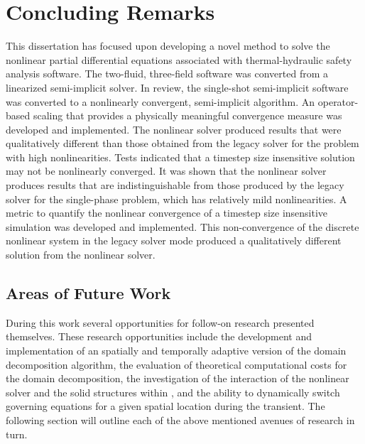 \chapter{Concluding Remarks}
\label{chap:end}
This dissertation has focused upon developing a novel method to solve the nonlinear partial differential equations associated with thermal-hydraulic safety analysis software.
The two-fluid, three-field software \cobra{} was converted from a linearized semi-implicit solver.
In review, the single-shot semi-implicit \cobra{} software was converted to a nonlinearly convergent, semi-implicit algorithm.
An operator-based scaling that provides a physically meaningful convergence measure was developed and implemented.
The nonlinear solver produced results that were qualitatively different than those obtained from the legacy solver for the problem with high nonlinearities.
Tests indicated that a timestep size insensitive solution may not be nonlinearly converged.
It was shown that the nonlinear solver produces results that are indistinguishable from those produced by the legacy solver for the single-phase problem, which has relatively mild nonlinearities.
A metric to quantify the nonlinear convergence of a timestep size insensitive simulation was developed and implemented.
This non-convergence of the discrete nonlinear system in the legacy solver mode produced a qualitatively different solution from the nonlinear solver.

\section{Areas of Future Work}
\label{sect:futureWork}
During this work several opportunities for follow-on research presented themselves.
These research opportunities include the development and implementation of an spatially and temporally adaptive version of the domain decomposition algorithm, the evaluation of theoretical computational costs for the domain decomposition, the investigation of the interaction of the nonlinear solver and the solid structures within \cobra{}, and the ability to dynamically switch governing equations for a given spatial location during the transient.
The following section will outline each of the above mentioned avenues of research in turn.

